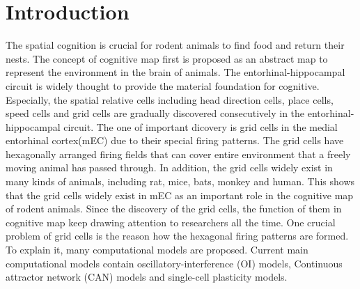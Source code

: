 \documentclass[final,5p,times,twocolumn,authoryear]{elsarticle}
\begin{document}
\section{Introduction}
The spatial cognition is crucial for rodent animals to find food and return their nests. The concept of cognitive map first is proposed as an abstract map to represent the environment in the brain of animals\citep{Tolman1948}. The entorhinal-hippocampal circuit is widely thought to provide the material foundation for cognitive\citep{McNaughton2006}. Especially, the spatial relative cells including head direction cells, place cells, speed cells and grid cells are gradually discovered consecutively in the entorhinal-hippocampal circuit. The one of important dicovery is grid cells in the medial entorhinal cortex(mEC)\citep{Moser2017} due to their special firing patterns. The grid cells have hexagonally arranged firing fields that can cover entire environment that a freely moving animal has passed through\citep{Rowland2016}. In addition, the grid cells widely exist in many kinds of animals, including rat, mice\citep{Fyhn2008}, bats\citep{Yartsev2011}, monkey\citep{Killian2012} and human\citep{Jacobs2013,Kunz2015,Doeller2010}. This shows that the grid cells widely exist in mEC as an important role in the cognitive map of rodent animals. Since the discovery of the grid cells, the function of them in cognitive map keep drawing attention to researchers all the time. One crucial problem of grid cells is the reason how the hexagonal firing patterns are formed. To explain it, many computational models are proposed. Current main computational models contain oscillatory-interference (OI) models, Continuous attractor network (CAN) models and single-cell plasticity models.
\end{document}
